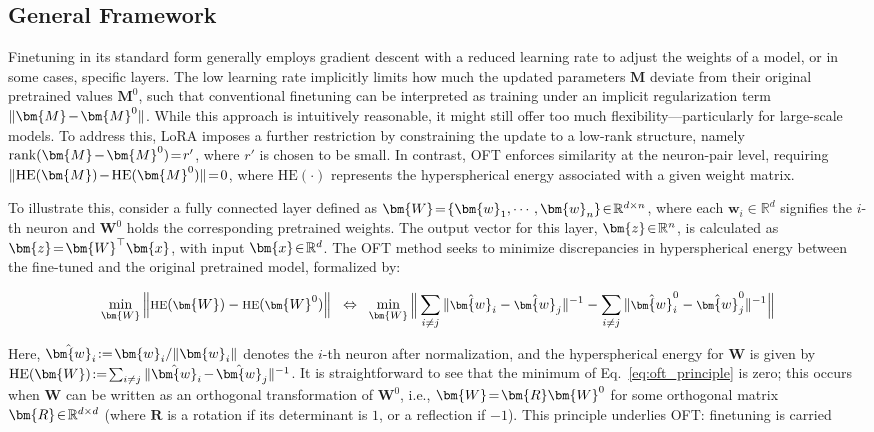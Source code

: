 \subsection{General Framework}

Finetuning in its standard form generally employs gradient descent with a reduced learning rate to adjust the weights of a model, or in some cases, specific layers. The low learning rate implicitly limits how much the updated parameters $\bm{M}$ deviate from their original pretrained values $\bm{M}^0$, such that conventional finetuning can be interpreted as training under an implicit regularization term $\thickmuskip=2mu \medmuskip=2mu \| \bm{M} - \bm{M}^0\|$. While this approach is intuitively reasonable, it might still offer too much flexibility—particularly for large-scale models. To address this, LoRA imposes a further restriction by constraining the update to a low-rank structure, namely $\thickmuskip=2mu \medmuskip=2mu \text{rank}(\bm{M} - \bm{M}^0) = r'$, where $r'$ is chosen to be small. In contrast, OFT enforces similarity at the neuron-pair level, requiring $\thickmuskip=2mu \medmuskip=2mu \| \text{HE}(\bm{M})-\text{HE}(\bm{M}^0) \| = 0$, where $\text{HE}(\cdot)$ represents the hyperspherical energy associated with a given weight matrix.

To illustrate this, consider a fully connected layer defined as $\thickmuskip=2mu \medmuskip=2mu \bm{W} = \{\bm{w}_1, \cdots, \bm{w}_n\} \in \mathbb{R}^{d\times n}$, where each $\bm{w}_i\in\mathbb{R}^d$ signifies the $i$-th neuron and $\bm{W}^0$ holds the corresponding pretrained weights. The output vector for this layer, $\thickmuskip=2mu \medmuskip=2mu \bm{z} \in \mathbb{R}^n$, is calculated as $\thickmuskip=2mu \medmuskip=2mu \bm{z} = \bm{W}^\top \bm{x}$, with input $\thickmuskip=2mu \medmuskip=2mu \bm{x} \in \mathbb{R}^d$. The OFT method seeks to minimize discrepancies in hyperspherical energy between the fine-tuned and the original pretrained model, formalized by:

\begin{equation}\label{eq:oft_principle}
\footnotesize
\min_{\bm{W}} \left\| \text{HE}(\bm{W})-\text{HE}(\bm{W}^0)\right\|~~\Leftrightarrow~~\min_{\bm{W}} \bigg{\|} \sum_{i\neq j} \|\hat{\bm{w}}_i-\hat{\bm{w}}_j\|^{-1}-\sum_{i\neq j} \|\hat{\bm{w}}^0_i-\hat{\bm{w}}^0_j\|^{-1}\bigg{\|}
\end{equation}

Here, $\thickmuskip=2mu \medmuskip=2mu \hat{\bm{w}}_i := \bm{w}_i / \| \bm{w}_i \|$ denotes the $i$-th neuron after normalization, and the hyperspherical energy for $\bm{W}$ is given by $\thickmuskip=2mu \medmuskip=2mu \text{HE}(\bm{W}) := \sum_{i\neq j} \|\hat{\bm{w}}_i-\hat{\bm{w}}_j\|^{-1}$. It is straightforward to see that the minimum of Eq.~\eqref{eq:oft_principle} is zero; this occurs when $\bm{W}$ can be written as an orthogonal transformation of $\bm{W}^0$, i.e., $\thickmuskip=2mu \medmuskip=2mu \bm{W} = \bm{R} \bm{W}^0$ for some orthogonal matrix $\thickmuskip=2mu \medmuskip=2mu \bm{R} \in \mathbb{R}^{d\times d}$ (where $\bm{R}$ is a rotation if its determinant is $1$, or a reflection if $-1$). This principle underlies OFT: finetuning is carried

